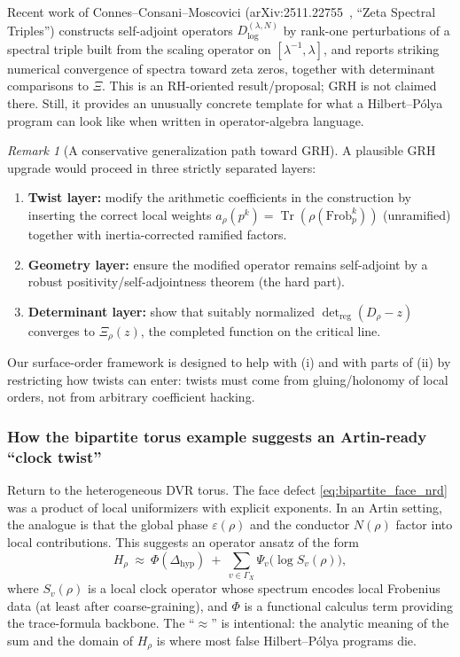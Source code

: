 \documentclass[11pt,oneside]{amsbook}
\numberwithin{equation}{section}
\theoremstyle{plain}
\theoremstyle{definition}
\theoremstyle{remark}
\newtheorem{remark}[theorem]{Remark}
\DeclareMathOperator{\Tr}{\mathrm{Tr}}
\begin{document}
Recent work of Connes--Consani--Moscovici (arXiv:2511.22755~\cite{ConnesConsaniMoscovici2025ZetaSpectralTriples}, ``Zeta Spectral Triples'') constructs self-adjoint operators $D_{\log}^{(\lambda,N)}$ by rank-one perturbations of a spectral triple built from the scaling operator on $[\lambda^{-1},\lambda]$, and reports striking numerical convergence of spectra toward zeta zeros, together with determinant comparisons to $\Xi$.
This is an RH-oriented result/proposal; GRH is not claimed there.
Still, it provides an unusually concrete template for what a Hilbert--Pólya program can look like when written in operator-algebra language.

\begin{remark}[A conservative generalization path toward GRH]
A plausible GRH upgrade would proceed in three strictly separated layers:
\begin{enumerate}[label=(\roman*)]
\item \textbf{Twist layer:} modify the arithmetic coefficients in the construction by inserting the correct local weights $a_\rho(p^k)=\Tr(\rho(\mathrm{Frob}_p^k))$ (unramified) together with inertia-corrected ramified factors.
\item \textbf{Geometry layer:} ensure the modified operator remains self-adjoint by a robust positivity/self-adjointness theorem (the hard part).
\item \textbf{Determinant layer:} show that suitably normalized $\det_{\mathrm{reg}}(D_\rho-z)$ converges to $\Xi_\rho(z)$, the completed function on the critical line.
\end{enumerate}
Our surface-order framework is designed to help with (i) and with parts of (ii) by restricting how twists can enter: twists must come from gluing/holonomy of local orders, not from arbitrary coefficient hacking.
\end{remark}

\subsubsection{How the bipartite torus example suggests an Artin-ready ``clock twist''}

Return to the heterogeneous DVR torus.
The face defect \eqref{eq:bipartite_face_nrd} was a product of local uniformizers with explicit exponents.
In an Artin setting, the analogue is that the global phase $\varepsilon(\rho)$ and the conductor $N(\rho)$ factor into local contributions.
This suggests an operator ansatz of the form
\[
H_\rho\ \approx\ \Phi(\Delta_{\mathrm{hyp}})\ +\ \sum_{v\in \Gamma_X} \Psi_v\!\big(\log S_v(\rho)\big),
\]
where $S_v(\rho)$ is a local clock operator whose spectrum encodes local Frobenius data (at least after coarse-graining), and $\Phi$ is a functional calculus term providing the trace-formula backbone.
The ``$\approx$'' is intentional: the analytic meaning of the sum and the domain of $H_\rho$ is where most false Hilbert--Pólya programs die.
\end{document}
